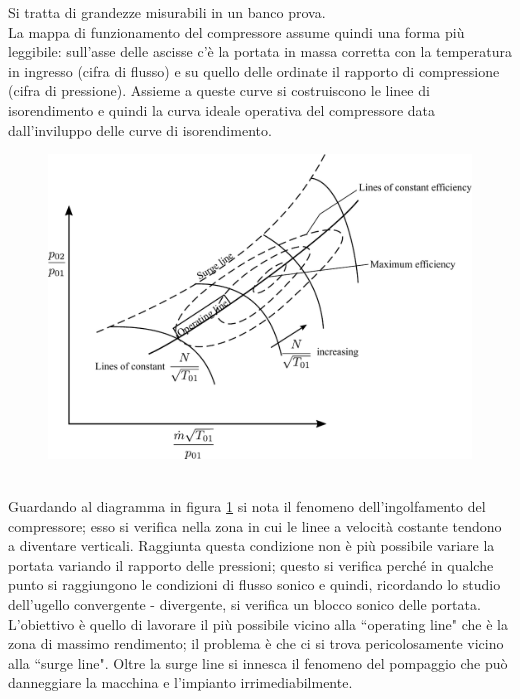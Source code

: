 Si tratta di grandezze misurabili in un banco prova.\\
La mappa di funzionamento del compressore assume quindi una forma più leggibile: sull'asse delle ascisse c'è la portata in massa corretta con la temperatura in ingresso (cifra di flusso) e su quello delle ordinate il rapporto di compressione (cifra di pressione). Assieme a queste curve si costruiscono le linee di isorendimento e quindi la curva ideale operativa del compressore data dall'inviluppo delle curve di isorendimento.
\begin{figure}
\centering
  \includegraphics[width=.8\textwidth]{fig/secondo_8.pdf}
\caption{}
\label{fig:secondo_8}
\end{figure}
\\Guardando al diagramma in figura \ref{fig:secondo_8} si nota il fenomeno dell'ingolfamento del compressore; esso si verifica nella zona in cui le linee a velocità costante tendono a diventare verticali. Raggiunta questa condizione non è più possibile variare la portata variando il rapporto delle pressioni; questo si verifica perché in qualche punto si raggiungono le condizioni di flusso sonico e quindi, ricordando lo studio dell'ugello convergente - divergente, si verifica un
blocco sonico delle portata.\\
L'obiettivo è quello di lavorare il più possibile vicino alla ``operating line" che è la zona di massimo rendimento; il problema è che ci si trova pericolosamente vicino alla ``surge line". Oltre la surge line si innesca il fenomeno del pompaggio che può danneggiare la macchina e l'impianto irrimediabilmente.

